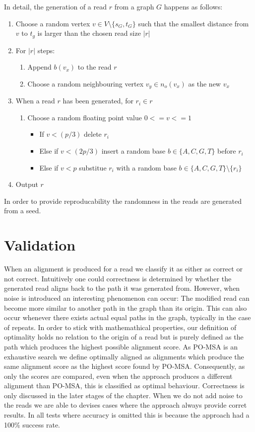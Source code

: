 \documentclass[thesis.tex]{subfiles}
\begin{document}
\par\noindent
In detail, the generation of a read $r$ from a graph $G$ happens as follows: 
\begin{enumerate}
  \item Choose a random vertex $v \in V\setminus\{s_G, t_G\}$ such that the smallest distance from $v$ to $t_g$ is larger than the chosen read size $|r|$
  \item For $|r|$ steps:
  \begin{enumerate}
    \item Append $b(v_x)$ to the read $r$
    \item Choose a random neighbouring vertex $v_y \in n_o(v_x)$ as the new $v_x$
  \end{enumerate}
  \item When a read $r$ has been generated, for $r_i \in r$
  \begin{enumerate}
    \item Choose a random floating point value $0<=v<=1$
    \begin{itemize}
      \item If $v<(p/3)$ delete $r_i$
      \item Else if $v<(2p/3)$ insert a random base $b \in \{A, C, G, T\}$ before $r_i$
      \item Else if $v<p$ substitue $r_i$ with a random base $b \in \{A, C, G, T\}\setminus\{r_i\}$
    \end{itemize}
  \end{enumerate}
  \item Output $r$
\end{enumerate}
In order to provide reproducability the randomness in the reads are generated from a seed.\\
\section{Validation}
\label{sec:performance_validation}
When an alignment is produced for a read we classify it as either as correct or not correct. Intuitively one could correctness is determined by whether the generated read aligns back to the path it was generated from. However, when noise is introduced an interesting phenomenon can occur: The modified read can become more similar to another path in the graph than its origin. This can also occur whenever there exists actual equal paths in the graph, typically in the case of repeats. In order to stick with mathemathical properties, our definition of optimality holds no relation to the origin of a read but is purely defined as the path which produces the highest possible alignment score. As PO-MSA is an exhaustive search we define optimally aligned as alignments which produce the same alignment score as the highest score found by PO-MSA. Consequently, as only the scores are compared, even when the approach produces a different alignment than PO-MSA, this is classified as optimal behaviour. Correctness is only discussed in the later stages of the chapter. When we do not add noise to the reads we are able to devises cases where the approach always provide corret results. In all tests where accuracy is omitted this is because the approach had a 100\% success rate.
\par\noindent
\end{document}
